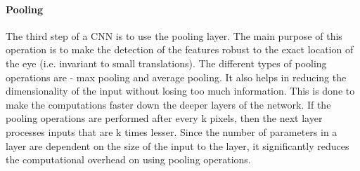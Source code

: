 {\paragraph{Pooling}
The third step of a \ac{CNN} is to use the pooling layer. The main purpose of this operation is to make the detection of the features robust to the exact location of the eye (i.e. invariant to small translations). The different types of pooling operations are - max pooling and average pooling. It also helps in reducing the dimensionality of the input without losing too much information. This is done to make the computations faster down the deeper layers of the network. If the pooling operations are performed after every k pixels, then the next layer processes inputs that are k times lesser. Since the number of parameters in a layer are dependent on the size of the input to the layer, it significantly reduces the computational overhead on using pooling operations.

}
